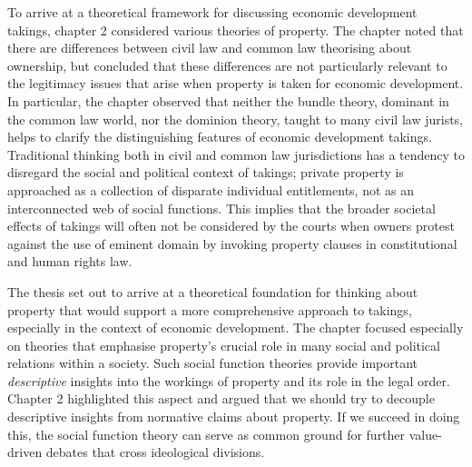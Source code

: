 
To arrive at a theoretical framework for discussing economic development takings, chapter 2 considered various theories of property. The chapter noted that there are differences between civil law and common law theorising about ownership, but concluded that these differences are not particularly relevant to the legitimacy issues that arise when property is taken for economic development. In particular, the chapter observed that neither the bundle theory, dominant in the common law world, nor the dominion theory, taught to many civil law jurists, helps to clarify the distinguishing features of economic development takings. Traditional thinking both in civil and common law jurisdictions has a tendency to disregard the social and political context of takings; private property is approached as a collection of disparate individual entitlements, not as an interconnected web of social functions. This implies that the broader societal effects of takings will often not be considered by the courts when owners protest against the use of eminent domain by invoking property clauses in constitutional and human rights law.

The thesis set out to arrive at a theoretical foundation for thinking about property that would support a more comprehensive approach to takings, especially in the context of economic development. The chapter focused especially on theories that emphasise property's crucial role in many social and political relations within a society. Such social function theories provide important {\it descriptive} insights into the workings of property and its role in the legal order. Chapter 2 highlighted this aspect and argued that we should try to decouple descriptive insights from normative claims about property. If we succeed in doing this, the social function theory can serve as common ground for further value-driven debates that cross ideological divisions.

